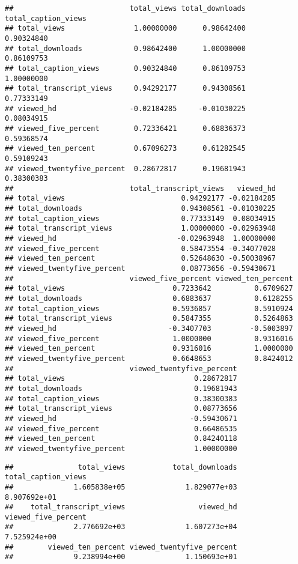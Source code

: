 \documentclass[
]{article}
\begin{document}
\begin{verbatim}
##                           total_views total_downloads total_caption_views
## total_views                1.00000000      0.98642400          0.90324840
## total_downloads            0.98642400      1.00000000          0.86109753
## total_caption_views        0.90324840      0.86109753          1.00000000
## total_transcript_views     0.94292177      0.94308561          0.77333149
## viewed_hd                 -0.02184285     -0.01030225          0.08034915
## viewed_five_percent        0.72336421      0.68836373          0.59368574
## viewed_ten_percent         0.67096273      0.61282545          0.59109243
## viewed_twentyfive_percent  0.28672817      0.19681943          0.38300383
##                           total_transcript_views   viewed_hd
## total_views                           0.94292177 -0.02184285
## total_downloads                       0.94308561 -0.01030225
## total_caption_views                   0.77333149  0.08034915
## total_transcript_views                1.00000000 -0.02963948
## viewed_hd                            -0.02963948  1.00000000
## viewed_five_percent                   0.58473554 -0.34077028
## viewed_ten_percent                    0.52648630 -0.50038967
## viewed_twentyfive_percent             0.08773656 -0.59430671
##                           viewed_five_percent viewed_ten_percent
## total_views                         0.7233642          0.6709627
## total_downloads                     0.6883637          0.6128255
## total_caption_views                 0.5936857          0.5910924
## total_transcript_views              0.5847355          0.5264863
## viewed_hd                          -0.3407703         -0.5003897
## viewed_five_percent                 1.0000000          0.9316016
## viewed_ten_percent                  0.9316016          1.0000000
## viewed_twentyfive_percent           0.6648653          0.8424012
##                           viewed_twentyfive_percent
## total_views                              0.28672817
## total_downloads                          0.19681943
## total_caption_views                      0.38300383
## total_transcript_views                   0.08773656
## viewed_hd                               -0.59430671
## viewed_five_percent                      0.66486535
## viewed_ten_percent                       0.84240118
## viewed_twentyfive_percent                1.00000000
\end{verbatim}

\begin{verbatim}
##               total_views           total_downloads       total_caption_views 
##              1.605838e+05              1.829077e+03              8.907692e+01 
##    total_transcript_views                 viewed_hd       viewed_five_percent 
##              2.776692e+03              1.607273e+04              7.525924e+00 
##        viewed_ten_percent viewed_twentyfive_percent 
##              9.238994e+00              1.150693e+01
\end{verbatim}
\end{document}
